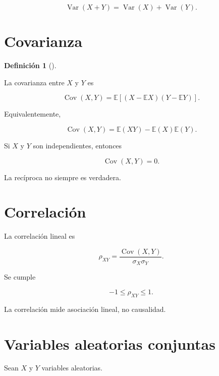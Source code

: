 \documentclass[
  spanish,
  10.5pt,
  letterpaper,
  DIV=11,
  numbers=noendperiod,
  oneside,
  open=any]{scrreprt}
\theoremstyle{definition}
\newtheorem{definition}{Definición}[chapter]
\theoremstyle{definition}
\theoremstyle{plain}
\theoremstyle{remark}
\begin{document}
\[
\operatorname{Var}(X+Y)
=
\operatorname{Var}(X)
+
\operatorname{Var}(Y).
\]

\section*{Covarianza}\label{covarianza}


\begin{definition}[]\protect\hypertarget{def-covarianza}{}\label{def-covarianza}

La covarianza entre \(X\) y \(Y\) es

\[
\operatorname{Cov}(X,Y)
=
\mathbb{E}
\left[
(X-\mathbb{E}X)
(Y-\mathbb{E}Y)
\right].
\]

\end{definition}

Equivalentemente,

\[
\operatorname{Cov}(X,Y)
=
\mathbb{E}(XY)
-
\mathbb{E}(X)\mathbb{E}(Y).
\]

Si \(X\) y \(Y\) son independientes, entonces

\[
\operatorname{Cov}(X,Y)=0.
\]

La recíproca no siempre es verdadera.

\section*{Correlación}\label{correlaciuxf3n}


La correlación lineal es

\[
\rho_{XY}
=
\frac{
\operatorname{Cov}(X,Y)
}{
\sigma_X\sigma_Y
}.
\]

Se cumple

\[
-1\leq\rho_{XY}\leq 1.
\]

La correlación mide asociación lineal, no causalidad.

\section*{Variables aleatorias
conjuntas}\label{variables-aleatorias-conjuntas}


Sean \(X\) y \(Y\) variables aleatorias.
\end{document}
